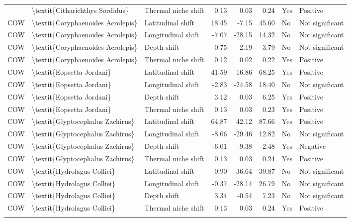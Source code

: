 \begin{longtable}[t]{lllrrrll}
{{COW & \textbackslash{}textit\{Citharichthys Sordidus\} & Thermal niche shift & 0.13 & 0.03 & 0.24 & Yes & Positive\\
COW & \textbackslash{}textit\{Coryphaenoides Acrolepis\} & Latitudinal shift & 18.45 & -7.15 & 45.60 & No & Not significant\\
COW & \textbackslash{}textit\{Coryphaenoides Acrolepis\} & Longitudinal shift & -7.07 & -28.15 & 14.32 & No & Not significant\\
COW & \textbackslash{}textit\{Coryphaenoides Acrolepis\} & Depth shift & 0.75 & -2.19 & 3.79 & No & Not significant\\
\addlinespace
COW & \textbackslash{}textit\{Coryphaenoides Acrolepis\} & Thermal niche shift & 0.12 & 0.02 & 0.22 & Yes & Positive\\
COW & \textbackslash{}textit\{Eopsetta Jordani\} & Latitudinal shift & 41.59 & 16.86 & 68.25 & Yes & Positive\\
COW & \textbackslash{}textit\{Eopsetta Jordani\} & Longitudinal shift & -2.83 & -24.58 & 18.40 & No & Not significant\\
COW & \textbackslash{}textit\{Eopsetta Jordani\} & Depth shift & 3.12 & 0.03 & 6.25 & Yes & Positive\\
COW & \textbackslash{}textit\{Eopsetta Jordani\} & Thermal niche shift & 0.13 & 0.03 & 0.23 & Yes & Positive\\
\addlinespace
COW & \textbackslash{}textit\{Glyptocephalus Zachirus\} & Latitudinal shift & 64.87 & 42.12 & 87.66 & Yes & Positive\\
COW & \textbackslash{}textit\{Glyptocephalus Zachirus\} & Longitudinal shift & -8.06 & -29.46 & 12.82 & No & Not significant\\
COW & \textbackslash{}textit\{Glyptocephalus Zachirus\} & Depth shift & -6.01 & -9.38 & -2.48 & Yes & Negative\\
COW & \textbackslash{}textit\{Glyptocephalus Zachirus\} & Thermal niche shift & 0.13 & 0.03 & 0.24 & Yes & Positive\\
COW & \textbackslash{}textit\{Hydrolagus Colliei\} & Latitudinal shift & 0.90 & -36.64 & 39.87 & No & Not significant\\
\addlinespace
COW & \textbackslash{}textit\{Hydrolagus Colliei\} & Longitudinal shift & -0.37 & -28.14 & 26.79 & No & Not significant\\
COW & \textbackslash{}textit\{Hydrolagus Colliei\} & Depth shift & 3.34 & -0.54 & 7.23 & No & Not significant\\
COW & \textbackslash{}textit\{Hydrolagus Colliei\} & Thermal niche shift & 0.13 & 0.03 & 0.24 & Yes & Positive\\
}}
\end{longtable}
